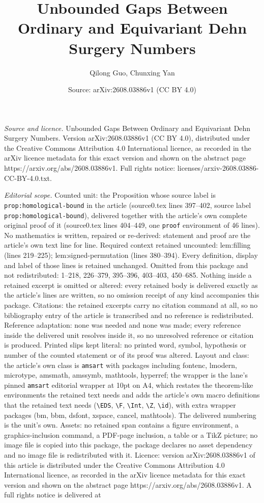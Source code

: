 \documentclass[10pt,a4paper]{amsart}
\title[Unbounded Gaps Between Ordinary and Equivariant Dehn Surgery]{Unbounded Gaps Between Ordinary and Equivariant Dehn Surgery Numbers}
\author{Qilong Guo, Chunxing Yan}
\date{Source: arXiv:2608.03886v1 (CC BY 4.0)}
\begin{document}
\maketitle

\noindent\emph{Source and licence.} Unbounded Gaps Between Ordinary and Equivariant Dehn Surgery Numbers. Version arXiv:2608.03886v1 (CC BY 4.0), distributed under the Creative Commons Attribution 4.0 International licence, as recorded in the arXiv licence metadata for this exact version and shown on the abstract page https://arxiv.org/abs/2608.03886v1. Full rights notice: licenses/arxiv-2608.03886-CC-BY-4.0.txt.\par\smallskip

\noindent\textit{Editorial scope.} Counted unit: the Proposition whose source label is \texttt{prop:homological-bound} in the article (source0.tex lines 397--402, source label \texttt{prop:homological-bound}), delivered together with the article's own complete original proof of it (source0.tex lines 404--449, one \texttt{proof} environment of 46 lines). No mathematics is written, repaired or re-derived: statement and proof are the article's own text line for line. Required context retained uncounted: lem:filling (lines 219--225); lem:signed-permutation (lines 380--394). Every definition, display and label of those lines is retained unchanged. Omitted from this package and not redistributed: 1--218, 226--379, 395--396, 403--403, 450--685. Nothing inside a retained excerpt is omitted or altered: every retained body is delivered exactly as the article's lines are written, so no omission receipt of any kind accompanies this package. Citations: the retained excerpts carry no citation command at all, so no bibliography entry of the article is transcribed and no reference is redistributed. Reference adaptation: none was needed and none was made; every reference inside the delivered unit resolves inside it, so no unresolved reference or citation is produced. Printed slips kept literal: no printed word, symbol, hypothesis or number of the counted statement or of its proof was altered. Layout and class: the article's own class is \texttt{amsart} with packages including fontenc, lmodern, microtype, amsmath, amssymb, mathtools, hyperref; the wrapper is the lane's pinned \texttt{amsart} editorial wrapper at 10pt on A4, which restates the theorem-like environments the retained text needs and adds the article's own macro definitions that the retained text needs (\texttt{\textbackslash EDS}, \texttt{\textbackslash F}, \texttt{\textbackslash Int}, \texttt{\textbackslash Z}, \texttt{\textbackslash id}), with extra wrapper packages (bm, bbm, dsfont, xspace, cancel, mathtools). The delivered numbering is the unit's own. Assets: no retained span contains a figure environment, a graphics-inclusion command, a PDF-page inclusion, a table or a TikZ picture; no image file is copied into this package, the package declares no asset dependency and no image file is redistributed with it. Licence: version arXiv:2608.03886v1 of this article is distributed under the Creative Commons Attribution 4.0 International licence, as recorded in the arXiv licence metadata for this exact version and shown on the abstract page https://arxiv.org/abs/2608.03886v1. A full rights notice is delivered at 
\end{document}
